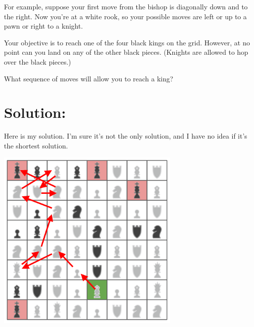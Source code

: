 \documentclass{article}
\begin{document}
For example, suppose your first move from the bishop is diagonally down and to the right.
Now you're at a white rook, so your possible moves are left or up to a pawn or right to a knight.

Your objective is to reach one of the four black kings on the grid.
However, at no point can you land on any of the other black pieces.
(Knights are allowed to hop over the black pieces.)

What sequence of moves will allow you to reach a king?



\section*{Solution:}

Here is my solution.
I'm sure it's not the only solution, and I have no idea if it's the shortest solution.

\begin{center}
\vspace{0.1in}
\includegraphics[width=3.5in]{chess_complete.png}
\end{center}
\end{document}
